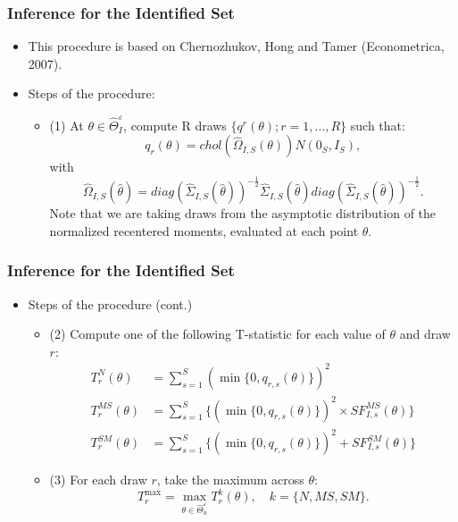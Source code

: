 \begin{frame}
\frametitle{Inference for the Identified Set}

\begin{itemize}
	\item This procedure is based on Chernozhukov, Hong and Tamer (Econometrica, 2007).
	\item Steps of the procedure:
	\begin{itemize}
		\item (1) At $\theta\in\widehat{\Theta}_{I}^{\varepsilon }$, compute R draws $\{q^{r}(\theta); r=1,\dots,R\}$ such that:
		\begin{equation*}
		q_{r}(\theta)=chol(\widehat{\Omega}_{I,S}(\theta))N(0_{S},I_{S}),
		\end{equation*}
		with
		\begin{equation*}
		\widehat{\Omega }_{I,S}(\hat{\theta})=diag(\widehat{\Sigma}_{I,S}(\hat{\theta}))^{-\frac{1}{2}}\widehat{\Sigma}_{I,S}(\hat{\theta})diag(\widehat{\Sigma}_{I,S}(\hat{\theta}))^{-\frac{1}{2}}.
		\end{equation*}
		Note that we are taking draws from the asymptotic distribution of the normalized recentered moments, evaluated at each point $\theta$.
	\end{itemize}
\end{itemize}
\end{frame}
\begin{frame}
\frametitle{Inference for the Identified Set}

\begin{itemize}
	\item Steps of the procedure (cont.)
	\begin{itemize}
		\item (2) Compute one of the following T-statistic for each value of $\theta$ and draw $r$:
		\begin{equation*}
		\begin{split}
		T^{N}_{r}(\theta)&=\sum_{s=1}^{S}(\min\{0,q_{r,s}(\theta)\})^{2}\\
		T^{MS}_{r}(\theta)&=\sum_{s=1}^{S}\{(\min\{0,q_{r,s}(\theta)\})^{2}\times SF^{MS}_{I,s}(\theta)\}\\
		T^{SM}_{r}(\theta)&=\sum_{s=1}^{S}\{(\min\{0,q_{r,s}(\theta)\})^{2} + SF^{SM}_{I,s}(\theta)\}
		\end{split}
		\end{equation*}
		\item (3) For each draw $r$, take the maximum across $\theta$:
		\begin{equation*}
		T^{\max}_{r}=\max_{\theta\in\widehat{\Theta}_{n}^{\varepsilon}}T^{k}_{r}(\theta),\quad k=\{N, MS, SM\}.
		\end{equation*}
	\end{itemize}
\end{itemize}
\end{frame}
